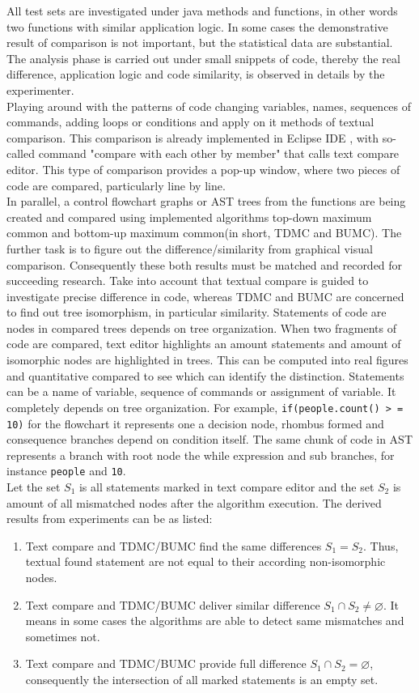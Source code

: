 \documentclass{report}
\begin{document}
All test sets are investigated under java methods and functions, in other words two functions with similar application logic. In some cases the demonstrative result of comparison is not important, but the statistical data are substantial. The analysis phase is carried out under small snippets of code, thereby the real difference, application logic and code similarity, is observed in details by the experimenter. 
\\
Playing around with the patterns of code changing variables, names, sequences of commands, adding loops or conditions and apply on it methods of textual comparison. This comparison is already implemented in Eclipse IDE \cite{eclipse_site}, with so-called command "compare with each other by member" that calls text compare editor. This type of comparison provides a pop-up window, where two pieces of code are compared, particularly line by line.
\\
In parallel, a control flowchart graphs or AST trees from the functions are being created and compared using implemented algorithms top-down maximum common and bottom-up maximum common(in short, TDMC and BUMC). The further task is to figure out the difference/similarity from graphical visual comparison. Consequently these both results must be matched and recorded for succeeding research. Take into account that textual compare is guided to investigate precise difference in code, whereas TDMC and BUMC are concerned to find out tree isomorphism, in particular similarity. Statements of code are nodes in compared trees depends on tree organization. When two fragments of code are compared, text editor highlights an amount statements and amount of isomorphic nodes are highlighted in trees. This can be computed into real figures and quantitative compared to see which can identify the distinction. Statements can be a name of variable, sequence of commands or assignment of variable. It completely depends on tree organization. For example, \texttt{if(people.count() > = 10)} for the flowchart it represents one a decision node, rhombus formed and consequence branches depend on condition itself. The same chunk of code in AST represents a branch with root node the while expression and sub branches, for instance \texttt{people} and \texttt{10}.
\\
Let the set $S_{1}$ is all statements marked in text compare editor and the set $S_{2}$ is amount of all mismatched nodes after the algorithm execution.
The derived results from experiments can be as listed: 
\begin{enumerate}
  \item Text compare and TDMC/BUMC find the same differences $S_{1} = S_{2} $. Thus, textual found statement are not equal to their according non-isomorphic nodes.
  \item Text compare and TDMC/BUMC deliver similar difference $S_{1} \cap S_{2} \neq \varnothing $. It means in some cases the algorithms are able to detect same mismatches and sometimes not.
  \item Text compare and TDMC/BUMC provide full difference $S_{1} \cap S_{2} = \varnothing $, consequently the intersection of all marked statements is an empty set.
\end{enumerate}
\end{document}
